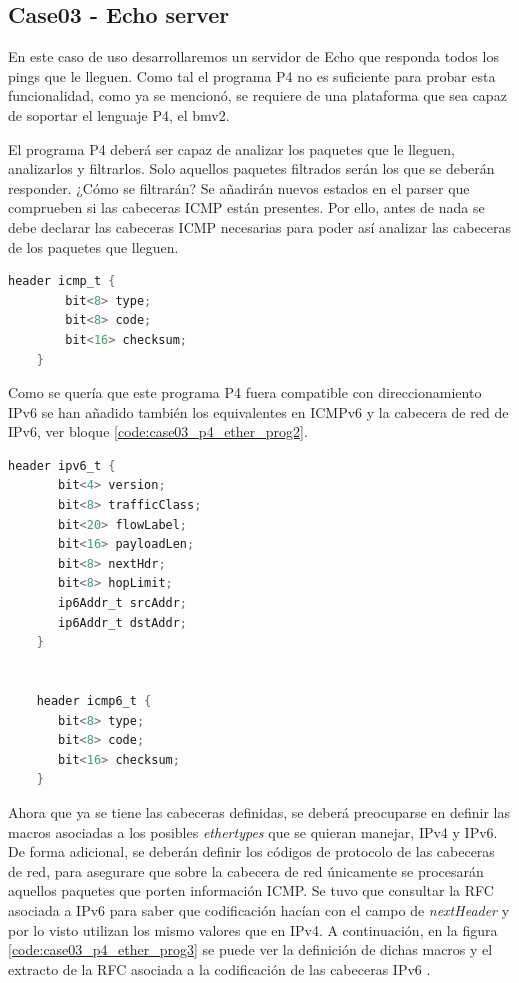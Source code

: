 \subsection{Case03 - Echo server}
\label{P4_ether_case03}


En este caso de uso desarrollaremos un servidor de Echo que responda todos los pings que le lleguen. Como tal el programa P4 no es suficiente para probar esta funcionalidad, como ya se mencionó, se requiere de una plataforma que sea capaz de soportar el lenguaje P4, el \gls{bmv2}. \\
\par

El programa P4 deberá ser capaz de analizar los paquetes que le lleguen, analizarlos y filtrarlos. Solo aquellos paquetes filtrados serán los que se deberán responder. ¿Cómo se filtrarán? Se añadirán nuevos estados en el parser que comprueben si las cabeceras ICMP están presentes. Por ello, antes de nada se debe declarar las cabeceras ICMP necesarias para poder así analizar las cabeceras de los paquetes que lleguen.

\begin{lstlisting}[language=C, style=P4-color, caption={Estructura cabecera ICMP - Case03},label=code:case03_p4_ether_prog1]
    header icmp_t {
    	bit<8> type;
    	bit<8> code;
    	bit<16> checksum;
    }
\end{lstlisting}
\vspace{0.5cm}

Como se quería que este programa P4 fuera compatible con direccionamiento IPv6 se han añadido también los equivalentes en ICMPv6 y la cabecera de red de IPv6, ver bloque \ref{code:case03_p4_ether_prog2}.

\begin{lstlisting}[language=C, style=P4-color, caption={Estructura cabeceras IPv6 e ICMPv6  - Case03},label=code:case03_p4_ether_prog2]
    header ipv6_t {
       bit<4> version;
       bit<8> trafficClass;
       bit<20> flowLabel;
       bit<16> payloadLen;
       bit<8> nextHdr;
       bit<8> hopLimit;
       ip6Addr_t srcAddr;
       ip6Addr_t dstAddr;	
    }
    
    
    header icmp6_t {
       bit<8> type;
       bit<8> code;
       bit<16> checksum;
    }
\end{lstlisting}
\vspace{0.5cm}

Ahora que ya se tiene las cabeceras definidas, se deberá preocuparse en definir las macros asociadas a los posibles \textit{ethertypes} que se quieran manejar, IPv4 y IPv6. De forma adicional, se deberán definir los códigos de protocolo de las cabeceras de red, para asegurare que sobre la cabecera de red únicamente se procesarán aquellos paquetes que porten información ICMP. Se tuvo que consultar la RFC asociada a IPv6 para saber que codificación hacían con el campo de \textit{nextHeader} y por lo visto utilizan los mismo valores que en IPv4. A continuación, en la figura \ref{code:case03_p4_ether_prog3} se puede ver la definición de dichas macros y el extracto de la RFC asociada a la codificación de las cabeceras IPv6 .\\
\par

